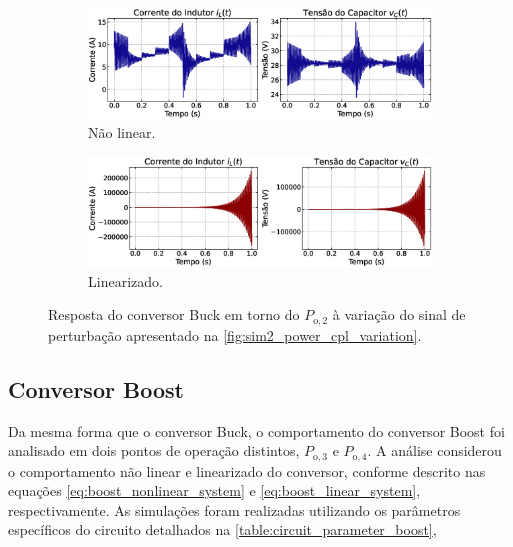 \begin{figure}[ht]
  \centering
  \captionsetup{justification=centering}
  \begin{subfigure}{1.\textwidth}
    \centering
    \includegraphics[width=1.\textwidth]{figuras/buck/sim2/op2/result_nonlinear.eps}
    \caption{Não linear.}
    \label{fig:sim2_op2_nonlinear}
  \end{subfigure}
  \newline
  \begin{subfigure}{1.\textwidth}
    \centering
    \includegraphics[width=1.\textwidth]{figuras/buck/sim2/op2/result_linear.eps}
    \caption{Linearizado.}
    \label{fig:simulation2_op2_linear}
  \end{subfigure}
  \caption{Resposta do conversor Buck em torno do $P_{\mathrm{o}, 2}$ à variação do sinal de perturbação apresentado na \autoref{fig:sim2_power_cpl_variation}.}
  \label{fig:simulation2_op2}
\end{figure}


\subsection{Conversor Boost}

Da mesma forma que o conversor Buck, o comportamento do conversor Boost foi analisado em dois pontos de operação distintos, $P_{\mathrm{o}, 3}$ e $P_{\mathrm{o}, 4}$. A análise considerou o comportamento não linear e linearizado do conversor, conforme descrito nas equações \eqref{eq:boost_nonlinear_system} e \eqref{eq:boost_linear_system}, respectivamente. As simulações foram realizadas utilizando os parâmetros específicos do circuito detalhados na \autoref{table:circuit_parameter_boost},

